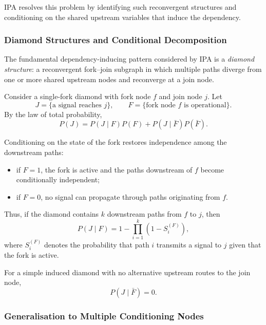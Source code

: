 \documentclass[preprint,12pt]{elsarticle}
\begin{document}
IPA resolves this problem by identifying such reconvergent structures and conditioning on the shared upstream variables that induce the dependency.

\subsubsection{Diamond Structures and Conditional Decomposition}

The fundamental dependency-inducing pattern considered by IPA is a \emph{diamond structure}: a reconvergent fork--join subgraph in which multiple paths diverge from one or more shared upstream nodes and reconverge at a join node.

Consider a single-fork diamond with fork node $f$ and join node $j$. Let
\[
J = \{\text{a signal reaches } j\}, \qquad
F = \{\text{fork node } f \text{ is operational}\}.
\]
By the law of total probability,
\begin{equation}
P(J) = P(J \mid F)P(F) + P(J \mid \bar{F})P(\bar{F}).
\label{eq:diamond_ltp}
\end{equation}

Conditioning on the state of the fork restores independence among the downstream paths:
\begin{itemize}
    \item if $F=1$, the fork is active and the paths downstream of $f$ become conditionally independent;
    \item if $F=0$, no signal can propagate through paths originating from $f$.
\end{itemize}

Thus, if the diamond contains $k$ downstream paths from $f$ to $j$, then
\begin{equation}
P(J \mid F) = 1-\prod_{i=1}^{k}\left(1-S_i^{(F)}\right),
\label{eq:diamond_conditional_update}
\end{equation}
where $S_i^{(F)}$ denotes the probability that path $i$ transmits a signal to $j$ given that the fork is active.

For a simple induced diamond with no alternative upstream routes to the join node,
\begin{equation}
P(J \mid \bar{F}) = 0.
\label{eq:diamond_no_alternative}
\end{equation}

\subsubsection{Generalisation to Multiple Conditioning Nodes}
\end{document}
